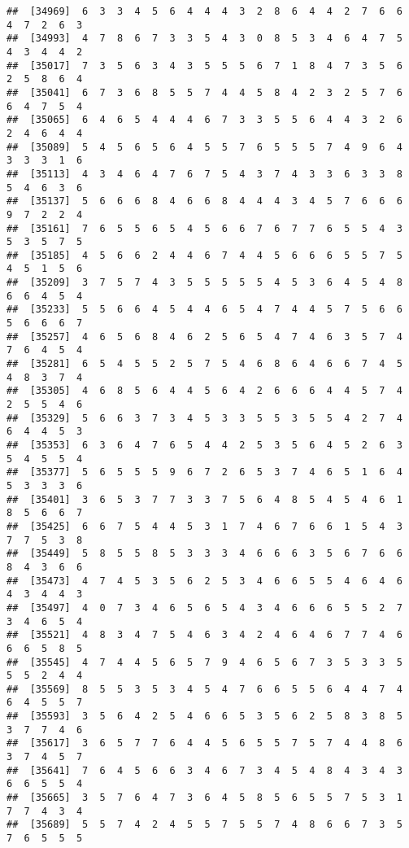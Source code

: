 \documentclass[
]{book}
\begin{document}
\begin{verbatim}
##  [34969]  6  3  3  4  5  6  4  4  4  3  2  8  6  4  4  2  7  6  6  4  7  2  6  3
##  [34993]  4  7  8  6  7  3  3  5  4  3  0  8  5  3  4  6  4  7  5  4  3  4  4  2
##  [35017]  7  3  5  6  3  4  3  5  5  5  6  7  1  8  4  7  3  5  6  2  5  8  6  4
##  [35041]  6  7  3  6  8  5  5  7  4  4  5  8  4  2  3  2  5  7  6  6  4  7  5  4
##  [35065]  6  4  6  5  4  4  4  6  7  3  3  5  5  6  4  4  3  2  6  2  4  6  4  4
##  [35089]  5  4  5  6  5  6  4  5  5  7  6  5  5  5  7  4  9  6  4  3  3  3  1  6
##  [35113]  4  3  4  6  4  7  6  7  5  4  3  7  4  3  3  6  3  3  8  5  4  6  3  6
##  [35137]  5  6  6  6  8  4  6  6  8  4  4  4  3  4  5  7  6  6  6  9  7  2  2  4
##  [35161]  7  6  5  5  6  5  4  5  6  6  7  6  7  7  6  5  5  4  3  5  3  5  7  5
##  [35185]  4  5  6  6  2  4  4  6  7  4  4  5  6  6  6  5  5  7  5  4  5  1  5  6
##  [35209]  3  7  5  7  4  3  5  5  5  5  5  4  5  3  6  4  5  4  8  6  6  4  5  4
##  [35233]  5  5  6  6  4  5  4  4  6  5  4  7  4  4  5  7  5  6  6  5  6  6  6  7
##  [35257]  4  6  5  6  8  4  6  2  5  6  5  4  7  4  6  3  5  7  4  7  6  4  5  4
##  [35281]  6  5  4  5  5  2  5  7  5  4  6  8  6  4  6  6  7  4  5  4  8  3  7  4
##  [35305]  4  6  8  5  6  4  4  5  6  4  2  6  6  6  4  4  5  7  4  2  5  5  4  6
##  [35329]  5  6  6  3  7  3  4  5  3  3  5  5  3  5  5  4  2  7  4  6  4  4  5  3
##  [35353]  6  3  6  4  7  6  5  4  4  2  5  3  5  6  4  5  2  6  3  5  4  5  5  4
##  [35377]  5  6  5  5  5  9  6  7  2  6  5  3  7  4  6  5  1  6  4  5  3  3  3  6
##  [35401]  3  6  5  3  7  7  3  3  7  5  6  4  8  5  4  5  4  6  1  8  5  6  6  7
##  [35425]  6  6  7  5  4  4  5  3  1  7  4  6  7  6  6  1  5  4  3  7  7  5  3  8
##  [35449]  5  8  5  5  8  5  3  3  3  4  6  6  6  3  5  6  7  6  6  8  4  3  6  6
##  [35473]  4  7  4  5  3  5  6  2  5  3  4  6  6  5  5  4  6  4  6  4  3  4  4  3
##  [35497]  4  0  7  3  4  6  5  6  5  4  3  4  6  6  6  5  5  2  7  3  4  6  5  4
##  [35521]  4  8  3  4  7  5  4  6  3  4  2  4  6  4  6  7  7  4  6  6  6  5  8  5
##  [35545]  4  7  4  4  5  6  5  7  9  4  6  5  6  7  3  5  3  3  5  5  5  2  4  4
##  [35569]  8  5  5  3  5  3  4  5  4  7  6  6  5  5  6  4  4  7  4  6  4  5  5  7
##  [35593]  3  5  6  4  2  5  4  6  6  5  3  5  6  2  5  8  3  8  5  3  7  7  4  6
##  [35617]  3  6  5  7  7  6  4  4  5  6  5  5  7  5  7  4  4  8  6  3  7  4  5  7
##  [35641]  7  6  4  5  6  6  3  4  6  7  3  4  5  4  8  4  3  4  3  6  6  5  5  4
##  [35665]  3  5  7  6  4  7  3  6  4  5  8  5  6  5  5  7  5  3  1  7  7  4  3  4
##  [35689]  5  5  7  4  2  4  5  5  7  5  5  7  4  8  6  6  7  3  5  7  6  5  5  5

\end{verbatim}
\end{document}
